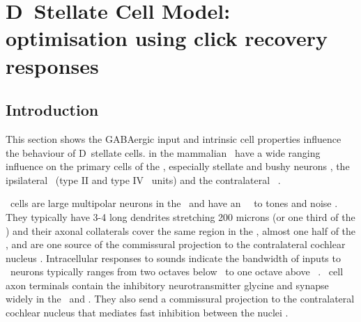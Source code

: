 

\section[DS Cell Model]{D~Stellate Cell Model: optimisation using click recovery responses    \label{sec:d-stellate-cell-model}}

\subsection{Introduction    \label{sec:DS:introduction}}

This section shows the GABAergic input and intrinsic cell properties
influence the behaviour of D~stellate cells.  in
the mammalian \VCN~have a wide ranging influence on the primary cells
of the \VCN, especially stellate and bushy neurons
\citep{RhodeSmithEtAl:1983}, the ipsilateral \DCN~(type II and type IV
\EIRA~units) and the contralateral \CN~\citep{NeedhamPaolini:2007}.


  
\DS~cells are large multipolar neurons in the \VCN~and have an \OnC~\PSTH~to
tones and noise \citep{SmithRhode:1989,NeedhamPaolini:2006}.  They typically
have 3-4 long dendrites stretching 200 microns (or one third of the \VCN) and
their axonal collaterals cover the same region in the \VCN, almost one half of
the \DCN, and are one source of the commissural projection to the contralateral
cochlear nucleus
\citep{Cant:1992,Cant:1981,SchofieldCant:1996,CantBenson:2003,NeedhamPaolini:2007,PaoliniClark:1999}. Intracellular
responses to sounds indicate the bandwidth of inputs to \DS~neurons typically
ranges from two octaves below \CF~to one octave above
\CF~\citep{PalmerJiangEtAl:1996, JiangPalmerEtAl:1996,
  PaoliniClark:1999}. \DS~cell axon terminals contain the inhibitory
neurotransmitter glycine and synapse widely in the \VCN~and \DCN.  They also
send a commissural projection to the contralateral cochlear nucleus that
mediates fast inhibition between the nuclei
\citep{NeedhamPaolini:2003,NeedhamPaolini:2006,Oertel:1997}.

